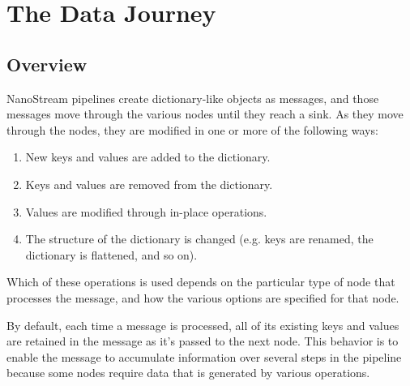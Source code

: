 \documentclass[letterpaper,10pt,english]{sphinxmanual}
\begin{document}
%
\begin{sphinxVerbatim}[commandchars=\\\{\}]
  
  
\end{sphinxVerbatim}


\chapter{The Data Journey}
\label{\detokenize{data_journey:the-data-journey}}\label{\detokenize{data_journey::doc}}

\section{Overview}
\label{\detokenize{data_journey:overview}}
NanoStream pipelines create dictionary-like objects as messages, and those
messages move through the various nodes until they reach a sink. As they move
through the nodes, they are modified in one or more of the following ways:
\begin{enumerate}
\def\theenumi{\arabic{enumi}}
\def\labelenumi{\theenumi .}
\makeatletter\def\p@enumii{\p@enumi \theenumi .}\makeatother
\item {} 
New keys and values are added to the dictionary.

\item {} 
Keys and values are removed from the dictionary.

\item {} 
Values are modified through in-place operations.

\item {} 
The structure of the dictionary is changed (e.g. keys are renamed, the
dictionary is flattened, and so on).

\end{enumerate}

Which of these operations is used depends on the particular type of node that
processes the message, and how the various options are specified for that
node.

By default, each time a message is processed, all of its existing keys and
values are retained in the message as it’s passed to the next node. This
behavior is to enable the message to accumulate information over several steps
in the pipeline because some nodes require data that is generated by various
operations.
\end{document}

